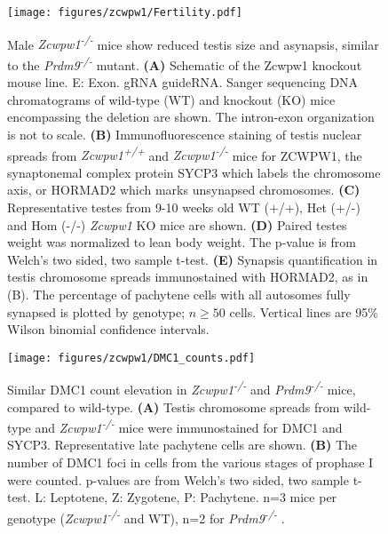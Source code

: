 \begin{figure}[H]
	\centering
	\texttt{[image: figures/zcwpw1/Fertility.pdf]}
	\caption[Zcwpw1 KO Phenotypes]{
		Male \textit{Zcwpw1\textsuperscript{-/-}} mice show reduced testis size and asynapsis, similar to the \textit{Prdm9\textsuperscript{-/-}} mutant.
		\textbf{(A)} Schematic of the Zcwpw1 knockout mouse line.
			E: Exon. gRNA guideRNA.
			Sanger sequencing DNA chromatograms of wild-type (WT) and knockout (KO) mice encompassing the deletion are shown.
			The intron-exon organization is not to scale.
		\textbf{(B)} Immunofluorescence staining of testis nuclear spreads from \textit{Zcwpw1\textsuperscript{+/+}} and \textit{Zcwpw1\textsuperscript{-/-}} mice for ZCWPW1, the synaptonemal complex protein SYCP3 which labels the chromosome axis, or HORMAD2 which marks unsynapsed chromosomes.
		\textbf{(C)} Representative testes from 9-10 weeks old WT (+/+), Het (+/-) and Hom (-/-) \textit{Zcwpw1} KO mice are shown.
		\textbf{(D)} Paired testes weight was normalized to lean body weight.
			The p-value is from Welch’s two sided, two sample t-test. \iffalse supp table 3 \fi
		\textbf{(E)} Synapsis quantification in testis chromosome spreads immunostained with HORMAD2, as in (B).
			The percentage of pachytene cells with all autosomes fully synapsed is plotted by genotype; $n\ge50$ cells.
			Vertical lines are 95\% Wilson binomial confidence intervals. \iffalse raw data table 4 \fi
	}
	\label{fig:Fertility}
\end{figure}

\begin{figure}[H]
	\centering
	\texttt{[image: figures/zcwpw1/DMC1\_counts.pdf]}
	\caption[DMC1 Counts]{
		Similar DMC1 count elevation in \textit{Zcwpw1\textsuperscript{-/-}} and \textit{Prdm9\textsuperscript{-/-}} mice, compared to wild-type.
		\textbf{(A)} Testis chromosome spreads from wild-type and \textit{Zcwpw1\textsuperscript{-/-}} mice were immunostained for DMC1 and SYCP3.
			Representative late pachytene cells are shown.
		\textbf{(B)} The number of DMC1 foci in cells from the various stages of prophase I were counted.
			p-values are from Welch’s two sided, two sample t-test.
			L: Leptotene, Z: Zygotene, P: Pachytene.
			n=3 mice per genotype (\textit{Zcwpw1\textsuperscript{-/-}} and WT), n=2 for \textit{Prdm9\textsuperscript{-/-}} \iffalse raw data \fi.
	}
	\label{fig:DMC1_count}
\end{figure}

